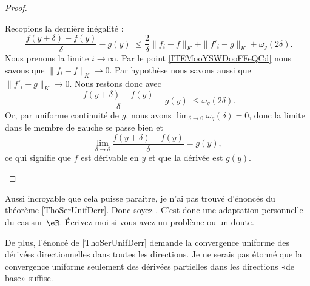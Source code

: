 \begin{proof}
\begin{subproof}
  Recopions la dernière inégalité :
  \begin{equation}
      \big| \frac{ f(y+\delta)-f(y) }{ \delta }-g(y) \big|\leq \frac{ 2 }{ \delta }\| f_i-f \|_K+\| f'_i-g \|_K+\omega_g(2\delta).
  \end{equation}
  Nous prenons la limite \( i\to \infty\). Par le point \ref{ITEMooYSWDooFFeQCd} nous savons que \( \| f_i-f \|_K\to 0\). Par hypothèse nous savons aussi que \( \| f'_i-g \|_K\to 0\). Nous restons donc avec
  \begin{equation}
      \big| \frac{ f(y+\delta)-f(y) }{ \delta }-g(y) \big|\leq \omega_g(2\delta).
  \end{equation}
  Or, par uniforme continuité de \( g\), nous avons $\lim_{\delta\to 0}\omega_g(\delta) = 0$, donc la limite dans le membre de gauche se passe bien et
  \begin{equation}
      \lim_{\delta\to \delta}\frac{ f(y+\delta)-f(y) }{ \delta }=g(y),
  \end{equation}
  ce qui signifie que \( f\) est dérivable en \( y\) et que la dérivée est \( g(y)\).
    \end{subproof}
\end{proof}

\begin{probleme}
    Aussi incroyable que cela puisse paraitre, je n'ai pas trouvé d'énoncés du théorème \ref{ThoSerUnifDerr}. Donc soyez . C'est donc une adaptation personnelle du cas sur \( \eR\). Écrivez-moi si vous avez un problème ou un doute.
\end{probleme}

\begin{probleme}
    De plus, l'énoncé de \ref{ThoSerUnifDerr} demande la convergence uniforme des dérivées directionnelles dans toutes les directions. Je ne serais pas étonné que la convergence uniforme seulement des dérivées partielles dans les directions «de base» suffise.
\end{probleme}

